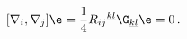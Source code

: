 \begin{equation} \label{integrability}
[\nabla_i,\nabla_j]\e = {1 \over 4} R_{ij}{}^{\underline{kl}}
\G_{\underline{kl}}\e =0\,.
\end{equation}

